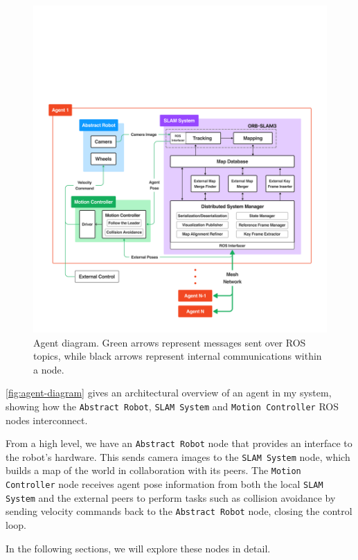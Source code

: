 \begin{figure}[h]
    \centering
    \includegraphics[trim=5cm 5cm 5cm 30cm, scale=0.2]{figures/agent_diagram.pdf}
    \caption{Agent diagram. Green arrows represent messages sent over ROS topics, while black arrows represent internal communications within a node.}
    \label{fig:agent-diagram}
\end{figure}

\autoref{fig:agent-diagram} gives an architectural overview of an agent in my system, showing how the \texttt{Abstract Robot}, \texttt{SLAM System} and \texttt{Motion Controller} ROS nodes interconnect.

From a high level, we have an \texttt{Abstract Robot} node that provides an interface to the robot's hardware. This sends camera images to the \texttt{SLAM System} node, which builds a map of the world in collaboration with its peers. The \texttt{Motion Controller} node receives agent pose information from both the local \texttt{SLAM System} and the external peers to perform tasks such as collision avoidance by sending velocity commands back to the \texttt{Abstract Robot} node, closing the control loop.

In the following sections, we will explore these nodes in detail.

